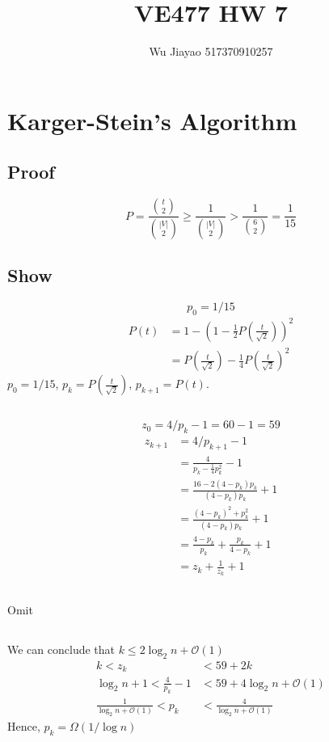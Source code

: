 \documentclass[12pt,a4paper]{article}
\title{VE477 HW 7}
\author{Wu Jiayao 517370910257}
\theoremstyle{definition}
\begin{document}
\maketitle
\section{Karger-Stein’s Algorithm}
\subsection{Proof}
$$
P = \frac{\binom{t}{2}}{\binom{|V|}{2}} \geq \frac{1}{\binom{|V|}{2}} > \frac{1}{\binom{6}{2}} = \frac{1}{15}
$$
\subsection{Show}
$$
p_0 = 1/15
$$
\begin{align*}
    P(t) &= 1-\left(1-\frac{1}{2} P\left(\frac{t}{\sqrt{2}}\right)\right)^{2} \\
        &= P(\frac{t}{\sqrt{2}}) - \frac{1}{4}P(\frac{t}{\sqrt{2}})^2
\end{align*}
$p_0 = 1/15$, $p_k=P(\frac{t}{\sqrt{2}})$, $p_{k+1}=P(t)$.
\subsection{}
$$
z_0 = 4/p_k-1=60-1=59
$$
\begin{align*}
    z_{k+1} &= 4/p_{k+1} -1 \\
            &= \frac{4}{p_k-\frac{1}{4}p_k^2} - 1 \\
            &= \frac{16-2(4-p_k)p_k}{(4-p_k)p_k} + 1 \\
            &= \frac{(4-p_k)^2+p_k^2}{(4-p_k)p_k}+1\\
            &= \frac{4-p_k}{p_k} + \frac{p_k}{4-p_k} + 1 \\
            &= z_k + \frac{1}{z_k} + 1
\end{align*}
\subsection{}
Omit
\subsection{}
We can conclude that $k \leq 2\log_2n+\mathcal{O}(1)$
\begin{align*}
    k < z_k &< 59+2k \\
    \log_2n + 1< \frac{4}{p_k} - 1 &< 59 + 4\log_2n+\mathcal{O}(1) \\ 
    \frac{1}{\log_2n+\mathcal{O}(1)} < p_k &< \frac{4}{\log_2n+\mathcal{O}(1)}
\end{align*}
Hence, $p_k=\Omega(1/\log n)$   
\end{document}

